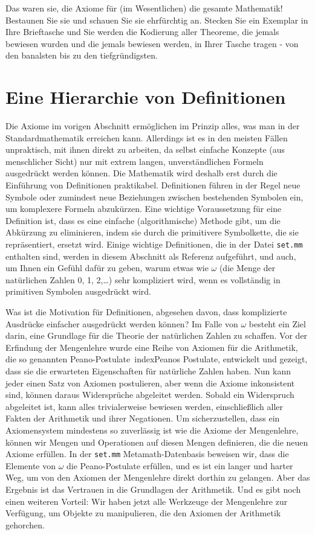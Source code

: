 Das waren sie, die Axiome für (im Wesentlichen) die gesamte Mathematik! Bestaunen Sie sie und schauen Sie sie ehrfürchtig an.  Stecken Sie ein Exemplar in Ihre Brieftasche und Sie werden die Kodierung aller Theoreme, die jemals bewiesen wurden und die jemals bewiesen werden, in Ihrer Tasche tragen - von den banalsten bis zu den tiefgründigsten.

\section{Eine Hierarchie von Definitionen}\label{hierarchy}

Die Axiome im vorigen Abschnitt ermöglichen im Prinzip alles, was man in der Standardmathematik erreichen kann.  Allerdings ist es in den meisten Fällen unpraktisch, mit ihnen direkt zu arbeiten, da selbst einfache Konzepte (aus menschlicher Sicht) nur mit extrem langen, unverständlichen Formeln ausgedrückt werden können. Die Mathematik wird deshalb erst durch die Einführung von Definitionen praktikabel. Definitionen führen in der Regel neue Symbole oder zumindest neue Beziehungen zwischen bestehenden Symbolen ein, um komplexere Formeln abzukürzen.  Eine wichtige Voraussetzung für eine Definition ist, dass es eine einfache (algorithmische) Methode gibt, um die Abkürzung zu eliminieren, indem sie durch die primitivere Symbolkette, die sie repräsentiert, ersetzt wird.  Einige wichtige Definitionen, die in der Datei \texttt{set.mm} enthalten sind, werden in diesem Abschnitt als Referenz aufgeführt, und auch, um Ihnen ein Gefühl dafür zu geben, warum etwas wie $\omega$ (die Menge der natürlichen Zahlen 0, 1, 2,\ldots) sehr kompliziert wird, wenn es vollständig in primitiven Symbolen ausgedrückt wird.

Was ist die Motivation für Definitionen, abgesehen davon, dass komplizierte Ausdrücke einfacher ausgedrückt werden können?  Im Falle von $\omega$ besteht ein Ziel darin, eine Grundlage für die Theorie der natürlichen Zahlen zu schaffen. Vor der Erfindung der Mengenlehre wurde eine Reihe von Axiomen für die Arithmetik, die so genannten Peano-Postulate\ index{Peanos Postulate}, entwickelt und gezeigt, dass sie die erwarteten Eigenschaften für natürliche Zahlen haben.  Nun kann jeder einen Satz von Axiomen postulieren, aber wenn die Axiome inkonsistent sind, können daraus Widersprüche abgeleitet werden.  Sobald ein Widerspruch abgeleitet ist, kann alles trivialerweise bewiesen werden, einschließlich aller Fakten der Arithmetik und ihrer Negationen.  Um sicherzustellen, dass ein Axiomensystem mindestens so zuverlässig ist wie die Axiome der Mengenlehre, können wir Mengen und Operationen auf diesen Mengen definieren, die die neuen Axiome erfüllen. In der \texttt{set.mm} Metamath-Datenbasis beweisen wir, dass die Elemente von $\omega$ die Peano-Postulate erfüllen, und es ist ein langer und harter Weg, um von den Axiomen der Mengenlehre direkt dorthin zu gelangen.  Aber das Ergebnis ist das Vertrauen in die Grundlagen der Arithmetik.  Und es gibt noch einen weiteren Vorteil: Wir haben jetzt alle Werkzeuge der Mengenlehre zur Verfügung, um Objekte zu manipulieren, die den Axiomen der Arithmetik gehorchen.


